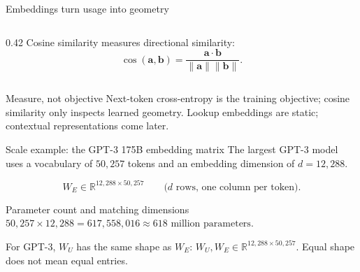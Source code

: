 \begin{frame}{Embeddings turn usage into geometry}
\begin{columns}[T]
\begin{column}{0.42\textwidth}
      \vspace{0.8em}
      Cosine similarity measures directional similarity:
      \[
        \cos(\mathbf{a},\mathbf{b})=
        \frac{\mathbf{a}\cdot\mathbf{b}}
        {\lVert\mathbf{a}\rVert\lVert\mathbf{b}\rVert}.
      \]

    \end{column}
  \end{columns}

  \vspace{-0.3em}
  \begin{alertblock}{Measure, not objective}
    \footnotesize
    Next-token cross-entropy is the training objective; cosine similarity only
    inspects learned geometry. Lookup embeddings are static; contextual
    representations come later.
  \end{alertblock}
\end{frame}

\begin{frame}{Scale example: the GPT-3 175B embedding matrix}
  \small
  The largest GPT-3 model uses a vocabulary of \(50{,}257\) tokens and an
  embedding dimension of \(d=12{,}288\).

  \[
    W_E\in\mathbb R^{12{,}288\times 50{,}257}
    \qquad
    \text{(\(d\) rows, one column per token).}
  \]

  \begin{center}
  \end{center}

  \vspace{-0.65em}
  \begin{alertblock}{Parameter count and matching dimensions}
    \footnotesize
    \centering
    \(50{,}257\times12{,}288
      =\boxed{617{,}558{,}016}\approx 618\text{ million parameters}\).

    \smallskip
    For GPT-3, \(W_U\) has the same shape as \(W_E\):
    \(W_U,W_E\in\mathbb R^{12{,}288\times50{,}257}\).
    Equal shape does not mean equal entries.
  \end{alertblock}
\end{frame}

